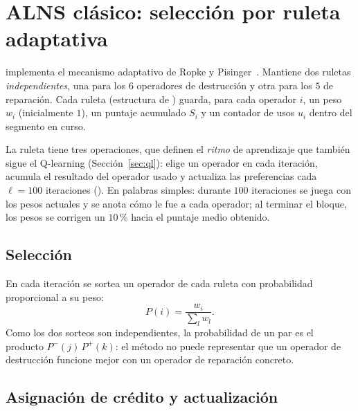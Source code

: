 \section{ALNS clásico: selección por ruleta adaptativa}
\label{sec:clasico}

 implementa el mecanismo adaptativo de Ropke y
Pisinger~\cite{ropke2006}. Mantiene dos ruletas \emph{independientes}, una para los $6$
operadores de destrucción y otra para los $5$ de reparación. Cada ruleta (estructura
 de ) guarda, para cada operador $i$, un peso $w_i$ (inicialmente
$1$), un puntaje acumulado $S_i$ y un contador de usos $u_i$ dentro del segmento en curso.

La ruleta tiene tres operaciones, que definen el \emph{ritmo} de aprendizaje que también
sigue el Q-learning (Sección~\ref{sec:ql}):  elige un operador en cada
iteración,  acumula el resultado del operador usado y 
actualiza las preferencias cada $\ell=100$ iteraciones (). En palabras
simples: durante $100$ iteraciones se juega con los pesos actuales y se anota cómo le fue a
cada operador; al terminar el bloque, los pesos se corrigen un $10$\,\% hacia el puntaje
medio obtenido.

\subsection{Selección}

En cada iteración se sortea un operador de cada ruleta con probabilidad proporcional a su peso:
\begin{equation}
P(i)=\frac{w_i}{\sum_{l} w_l}.
\label{eq:ruleta}
\end{equation}
Como los dos sorteos son independientes, la probabilidad de un par es el producto
$P^{-}(j)\,P^{+}(k)$: el método no puede representar que un operador de destrucción funcione
mejor con un operador de reparación concreto.

\subsection{Asignación de crédito y actualización}

